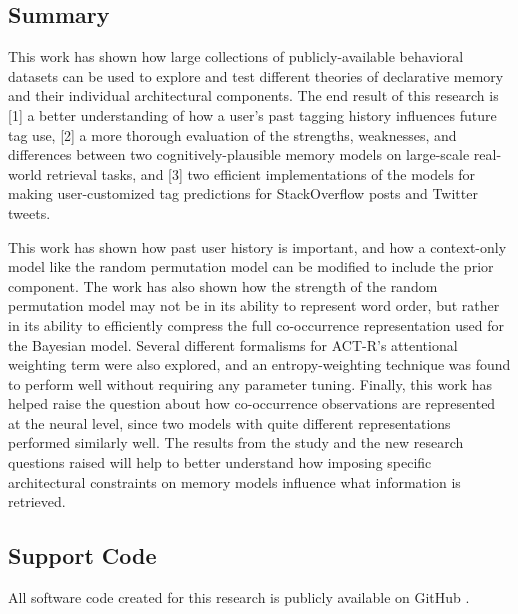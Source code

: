 \documentclass[man,floatsintext,donotrepeattitle]{apa6}
\begin{document}
\subsection{Summary}

This work has shown how large collections of publicly-available behavioral datasets can be used to explore and test different theories of declarative memory and their individual architectural components.
The end result of this research is [1] a better understanding of how a user's past tagging history influences future tag use,
[2] a more thorough evaluation of the strengths, weaknesses, and differences between two cognitively-plausible memory models on large-scale real-world retrieval tasks,
and [3] two efficient implementations of the models for making user-customized tag predictions for StackOverflow posts and Twitter tweets. 

This work has shown how past user history is important, and how a context-only model like the random permutation model can be modified to include the prior component.
The work has also shown how the strength of the random permutation model may not be in its ability to represent word order,
but rather in its ability to efficiently compress the full co-occurrence representation used for the Bayesian model.
Several different formalisms for ACT-R's attentional weighting term were also explored, and an entropy-weighting technique was found to perform well without requiring any parameter tuning.
Finally, this work has helped raise the question about how co-occurrence observations are represented at the neural level, since two models with quite different representations performed similarly well.
The results from the study and the new research questions raised will help to better understand how imposing specific architectural constraints on memory models influence what information is retrieved.

\subsection{Support Code}

All software code created for this research is publicly available on GitHub \parencite{StanleyRepo2014}.


\clearpage
\printbibliography[heading=bibintoc]
\end{document}
